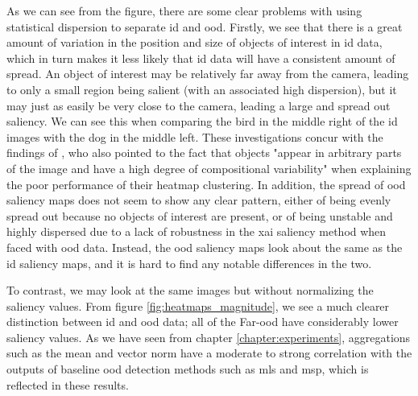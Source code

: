 \documentclass[UKenglish]{uiomasterthesis} %
\theoremstyle{definition}
\begin{document}
As we can see from the figure, there are some clear problems with using statistical dispersion to separate \ac{id} and \ac{ood}. Firstly, we see that there is a great amount of variation in the position and size of objects of interest in \ac{id} data, which in turn makes it less likely that \ac{id} data will have a consistent amount of spread. An object of interest may be relatively far away from the camera, leading to only a small region being salient (with an associated high dispersion), but it may just as easily be very close to the camera, leading a large and spread out saliency. We can see this when comparing the bird in the middle right of the \ac{id} images with the dog in the middle left. These investigations concur with the findings of \cite{martinez}, who also pointed to the fact that objects "appear in arbitrary parts of the image and have a high degree of compositional variability" when explaining the poor performance of their heatmap clustering. In addition, the spread of \ac{ood} saliency maps does not seem to show any clear pattern, either of being evenly spread out because no objects of interest are present, or of being unstable and highly dispersed due to a lack of robustness in the \ac{xai} saliency method when faced with \ac{ood} data. Instead, the \ac{ood} saliency maps look about the same as the \ac{id} saliency maps, and it is hard to find any notable differences in the two.

To contrast, we may look at the same images but without normalizing the saliency values. From figure \ref{fig:heatmaps_magnitude}, we see a much clearer distinction between \ac{id} and \ac{ood} data; all of the Far-\ac{ood} have considerably lower saliency values. As we have seen from chapter \ref{chapter:experiments}, aggregations such as the mean and vector norm have a moderate to strong correlation with the outputs of baseline \ac{ood} detection methods such as \ac{mls} and \ac{msp}, which is reflected in these results.
\end{document}
